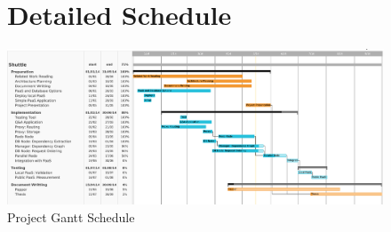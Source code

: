 \begin{figure}
  \appendix
\section{Detailed Schedule}
\label{sec:DetailedSchedule}
  \includegraphics[width=220mm]{images/gantt}
  \caption{Project Gantt Schedule}
  \label{gantt}
\end{figure}
\restoregeometry
